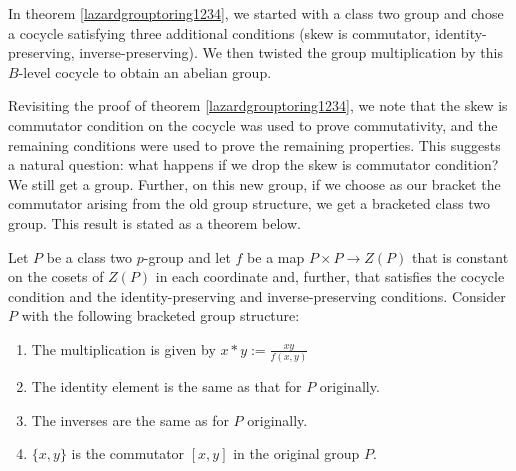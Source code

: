 \documentclass[10pt]{amsart}
\begin{document}
In theorem \ref{lazardgrouptoring1234}, we started with a class two
group and chose a cocycle satisfying three additional conditions (skew
is commutator, identity-preserving, inverse-preserving). We then
twisted the group multiplication by this $B$-level cocycle to obtain
an abelian group.

Revisiting the proof of theorem \ref{lazardgrouptoring1234}, we note
that the skew is commutator condition on the cocycle was used to prove
commutativity, and the remaining conditions were used to prove the
remaining properties. This suggests a natural question: what happens
if we drop the skew is commutator condition? We still get a
group. Further, on this new group, if we choose as our bracket the
commutator arising from the old group structure, we get a bracketed
class two group. This result is stated as a theorem below.

\begin{theorem}
  Let $P$ be a class two $p$-group and let $f$ be a map $P \times P
  \to Z(P)$ that is constant on the cosets of $Z(P)$ in each
  coordinate and, further, that satisfies the cocycle condition and
  the identity-preserving and inverse-preserving conditions. Consider
  $P$ with the following bracketed group structure:

  \begin{enumerate}
  \item The multiplication is given by $x * y :=
  \frac{xy}{f(x,y)}$
  \item The identity element is the same as that for $P$ originally.
  \item The inverses are the same as for $P$ originally.
  \item $\{ x,y \}$ is the commutator $[x,y]$ in the original group
    $P$.
  \end{enumerate}
\end{theorem}
\end{document}
